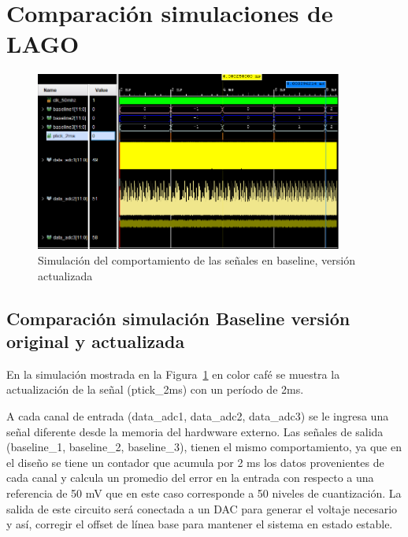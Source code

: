 \section{\textbf{Comparación simulaciones de LAGO}}

\begin{figure}[H]
\includegraphics[width=0.9\textwidth]{Figs/actualbase.PNG} 
\centering
\caption{Simulación del comportamiento de las señales en baseline, versión actualizada}
\label{sim2ms}
\end{figure}

\subsection{Comparación simulación Baseline versión original y actualizada}
En la simulación mostrada en la Figura~\ref{sim2ms} en color café se muestra la actualización de la señal (ptick\_2ms) con un período de 2ms.

A cada canal de entrada (data\_adc1, data\_adc2, data\_adc3) se le ingresa una señal diferente desde la memoria del hardwware externo. Las señales de salida (baseline\_1, baseline\_2, baseline\_3), tienen el mismo comportamiento, ya que en el diseño se tiene un contador que acumula por 2 ms los datos provenientes de cada canal y calcula un promedio del error en la entrada con respecto a una referencia de 50 mV que en este caso corresponde a 50 niveles de cuantización. La salida de este circuito será conectada a un DAC para generar el voltaje necesario y así, corregir el offset de línea base para mantener el sistema en estado estable.  



